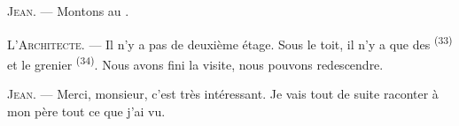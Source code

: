 \textsc{Jean}. --- Montons au .

\textsc{L'Architecte}. --- Il n'y a pas de deuxième étage. Sous le toit, il n'y
a que des  \textsuperscript{(33)} et le grenier
\textsuperscript{(34)}. Nous avons fini la visite, nous pouvons redescendre.

\textsc{Jean}. --- Merci, monsieur, c'est très intéressant. Je vais tout de
suite raconter à mon père tout ce que j'ai vu.
\VUsaut{4.0mm}
\VUfilet{22mm}

